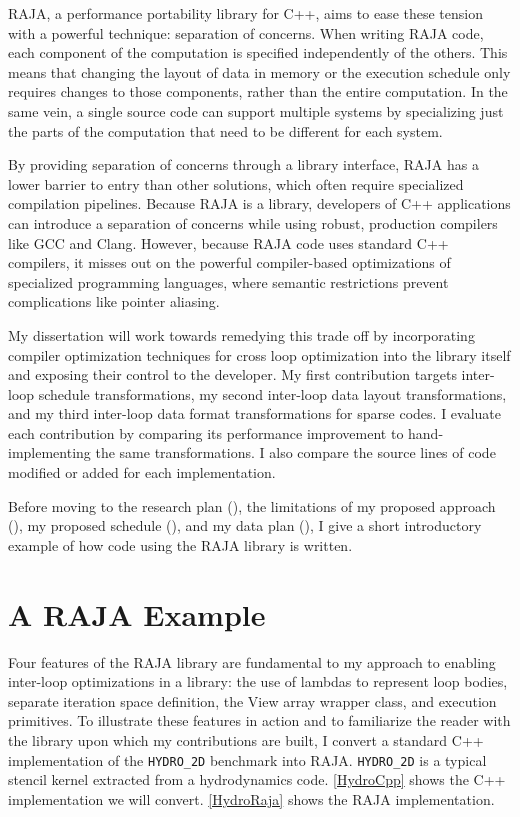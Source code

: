 \documentclass{article}
\begin{document}
RAJA, a performance portability library for C++, aims to ease these tension with a powerful technique: separation of concerns.
When writing RAJA code, each component of the computation is specified independently of the others.
This means that changing the layout of data in memory or the execution schedule only requires changes to those components, rather than the entire computation.
In the same vein, a single source code can support multiple systems by specializing just the parts of the computation that need to be different for each system.

By providing separation of concerns through a library interface, RAJA has a lower barrier to entry than other solutions, which often require specialized compilation pipelines. 
Because RAJA is a library, developers of C++ applications can introduce a separation of concerns while using robust, production compilers like GCC and Clang.
However, because RAJA code uses standard C++ compilers, it misses out on the powerful compiler-based optimizations of specialized programming languages, where semantic restrictions prevent complications like pointer aliasing.

My dissertation will work towards remedying this trade off by incorporating compiler optimization techniques for cross loop optimization into the library itself and exposing their control to the developer. 
My first contribution targets inter-loop schedule transformations, my second inter-loop data layout transformations, and my third inter-loop data format transformations for sparse codes.
I evaluate each contribution by comparing its performance improvement to hand-implementing the same transformations.
I also compare the source lines of code modified or added for each implementation.

Before moving to the research plan (), the limitations of my proposed approach (), my proposed schedule (), and my data plan (), I give a short introductory example of how code using the RAJA library is written.

\section{A RAJA Example}

Four features of the RAJA library are fundamental to my approach to enabling inter-loop optimizations in a library: the use of lambdas to represent loop bodies, separate iteration space definition, the View array wrapper class, and execution primitives.
To illustrate these features in action and to familiarize the reader with the library upon which my contributions are built, I convert a standard C++ implementation of the \verb.HYDRO_2D. benchmark into RAJA. 
\verb.HYDRO_2D. is a typical stencil kernel extracted from a hydrodynamics code. 
\autoref{HydroCpp} shows the C++ implementation we will convert.
\autoref{HydroRaja} shows the RAJA implementation.
\end{document}
